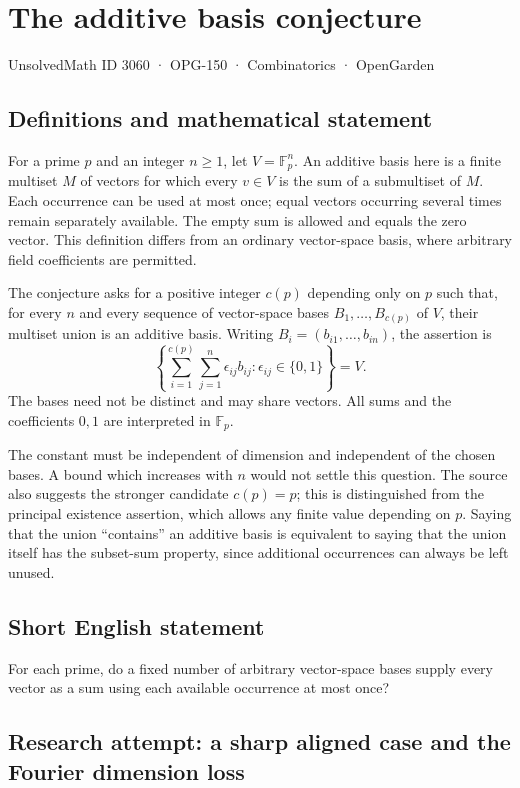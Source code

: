 \documentclass[11pt,a4paper]{article}
\begin{document}
\section*{The additive basis conjecture}\label{3060}
{\small UnsolvedMath ID 3060 · OPG-150 · Combinatorics · OpenGarden}
\subsection{Definitions and mathematical statement}
For a prime $p$ and an integer $n\ge1$, let $V=\mathbb F_p^n$.
An additive basis here is a finite multiset $M$ of vectors for which every
$v\in V$ is the sum of a submultiset of $M$. Each occurrence can be used
at most once; equal vectors occurring several times remain separately
available. The empty sum is allowed and equals the zero vector.
This definition differs from an ordinary vector-space basis, where
arbitrary field coefficients are permitted.

The conjecture asks for a positive integer $c(p)$ depending only on $p$
such that, for every $n$ and every sequence of vector-space bases
$B_1,\ldots,B_{c(p)}$ of $V$, their multiset union is an additive basis.
Writing $B_i=(b_{i1},\ldots,b_{in})$, the assertion is
\[
 \left\{\sum_{i=1}^{c(p)}\sum_{j=1}^n
                 \epsilon_{ij}b_{ij}:\epsilon_{ij}\in\{0,1\}\right\}=V.
\]
The bases need not be distinct and may share vectors. All sums and the
coefficients $0,1$ are interpreted in $\mathbb F_p$.

The constant must be independent of dimension and independent of the
chosen bases. A bound which increases with $n$ would not settle this
question. The source also suggests the stronger candidate $c(p)=p$;
this is distinguished from the principal existence assertion, which
allows any finite value depending on $p$. Saying that the union
``contains'' an additive basis is equivalent to saying that the union
itself has the subset-sum property, since additional occurrences can
always be left unused.
\subsection{Short English statement}
For each prime, do a fixed number of arbitrary vector-space bases supply every vector as a sum using each available occurrence at most once?
\subsection{Research attempt: a sharp aligned case and the Fourier dimension loss}
\end{document}
